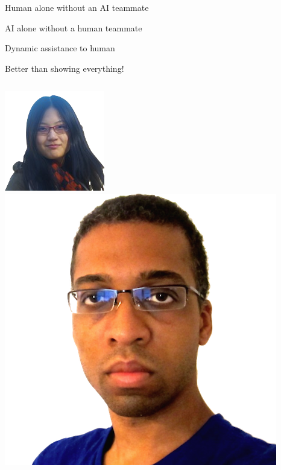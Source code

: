 \documentclass[compress]{beamer}
\newcommand{\fsi}[2]{
\begin{frame}[plain]
\vspace*{-1pt}
\makebox[\linewidth]{\texttt{[image: \#1]}}
\begin{center}
#2
\end{center}
\end{frame}
}
\begin{document}
\fsi{qb/augment/bandit_result_none}{Human alone without an AI teammate}
\fsi{qb/augment/bandit_result_ai}{AI alone without a human teammate}
\fsi{qb/augment/bandit_result_dynamic}{Dynamic assistance to human}
\fsi{qb/augment/bandit_result}{Better than showing everything!}

\begin{frame}{}
  \begin{columns}
    \begin{center}
        \includegraphics[width=0.8\linewidth]{general_figures/hehe} \\
        \includegraphics[width=0.8\linewidth]{general_figures/alvin}

\end{center}
\end{columns}
\end{frame}
\end{document}
